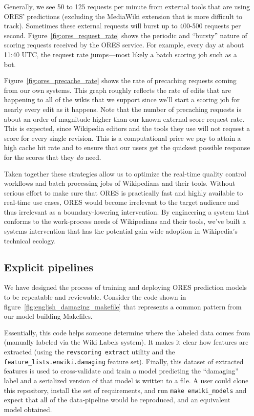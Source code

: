 Generally, we see 50 to 125 requests per minute from external tools that are using ORES' predictions (excluding the MediaWiki extension that is more difficult to track).  Sometimes these external requests will burst up to 400-500 requests per second.  Figure~\ref{fig:ores_request_rate} shows the periodic and ``bursty'' nature of scoring requests received by the ORES service.  For example, every day at about 11:40 UTC, the request rate jumps---most likely a batch scoring job such as a bot.

Figure~\ref{fig:ores_precache_rate} shows the rate of precaching requests coming from our own systems.  This graph roughly reflects the rate of edits that are happening to all of the wikis that we support since we'll start a scoring job for nearly every edit as it happens.  Note that the number of precaching requests is about an order of magnitude higher than our known external score request rate.  This is expected, since Wikipedia editors and the tools they use will not request a score for every single revision.  This is a computational price we pay to attain a high cache hit rate and to ensure that our users get the quickest possible response for the scores that they \emph{do} need.

Taken together these strategies allow us to optimize the real-time quality control workflows and batch processing jobs of Wikipedians and their tools.  Without serious effort to make sure that ORES is practically fast and highly available to real-time use cases, ORES would become irrelevant to the target audience and thus irrelevant as a boundary-lowering intervention.  By engineering a system that conforms to the work-process needs of Wikipedians and their tools, we've built a systems intervention that has the potential gain wide adoption in Wikipedia's technical ecology.

\subsection{Explicit pipelines}
\label{sec:appendix.explicit_pipelines}
We have designed the process of training and deploying ORES prediction models to be repeatable and reviewable.  Consider the code shown in figure~\ref{fig:english_damaging_makefile} that represents a common pattern from our model-building Makefiles.

Essentially, this code helps someone determine where the labeled data comes from (manually labeled via the Wiki Labels system).  It makes it clear how features are extracted (using the \texttt{revscoring extract} utility and the \texttt{feature\_lists.enwiki.damaging} feature set).  Finally, this dataset of extracted features is used to cross-validate and train a model predicting the ``damaging'' label and a serialized version of that model is written to a file.  A user could clone this repository, install the set of requirements, and run \texttt{make enwiki\_models} and expect that all of the data-pipeline would be reproduced, and an equivalent model obtained.

